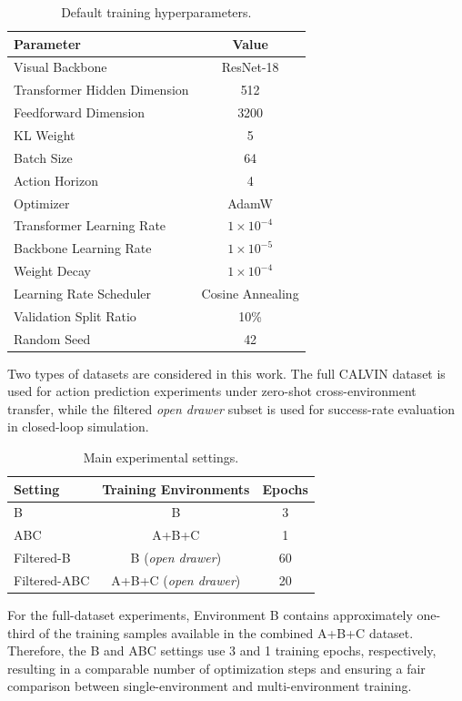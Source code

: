 \begin{table}[h]
\centering
\caption{Default training hyperparameters.}
\label{tab:training_config}
\begin{tabular}{lc}
\toprule
Parameter & Value \\
\midrule
Visual Backbone & ResNet-18 \\
Transformer Hidden Dimension & 512 \\
Feedforward Dimension & 3200 \\
KL Weight & 5 \\
Batch Size & 64 \\
Action Horizon & 4 \\
Optimizer & AdamW \\
Transformer Learning Rate & $1\times10^{-4}$ \\
Backbone Learning Rate & $1\times10^{-5}$ \\
Weight Decay & $1\times10^{-4}$ \\
Learning Rate Scheduler & Cosine Annealing \\
Validation Split Ratio & 10\% \\
Random Seed & 42 \\
\bottomrule
\end{tabular}
\end{table}

Two types of datasets are considered in this work. The full CALVIN dataset is used for action prediction experiments under zero-shot cross-environment transfer, while the filtered \textit{open drawer} subset is used for success-rate evaluation in closed-loop simulation.

\begin{table}[h]
\centering
\caption{Main experimental settings.}
\label{tab:experiment_settings}
\begin{tabular}{lcc}
\toprule
Setting & Training Environments & Epochs \\
\midrule
B & B & 3 \\
ABC & A+B+C & 1 \\
Filtered-B & B (\textit{open drawer}) & 60 \\
Filtered-ABC & A+B+C (\textit{open drawer}) & 20 \\
\bottomrule
\end{tabular}
\end{table}

For the full-dataset experiments, Environment B contains approximately one-third of the training samples available in the combined A+B+C dataset. Therefore, the B and ABC settings use 3 and 1 training epochs, respectively, resulting in a comparable number of optimization steps and ensuring a fair comparison between single-environment and multi-environment training.

